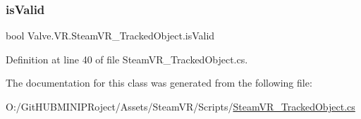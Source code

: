 \subsubsection{\texorpdfstring{isValid}{isValid}}
{\footnotesize\ttfamily bool Valve.\+V\+R.\+Steam\+V\+R\+\_\+\+Tracked\+Object.\+is\+Valid\hspace{0.3cm}{\ttfamily [get]}}



Definition at line 40 of file Steam\+V\+R\+\_\+\+Tracked\+Object.\+cs.



The documentation for this class was generated from the following file\+:\begin{DoxyCompactItemize}
\item 
O\+:/\+Git\+H\+U\+B\+M\+I\+N\+I\+P\+Roject/\+Assets/\+Steam\+V\+R/\+Scripts/\mbox{\hyperlink{_steam_v_r___tracked_object_8cs}{Steam\+V\+R\+\_\+\+Tracked\+Object.\+cs}}\end{DoxyCompactItemize}
